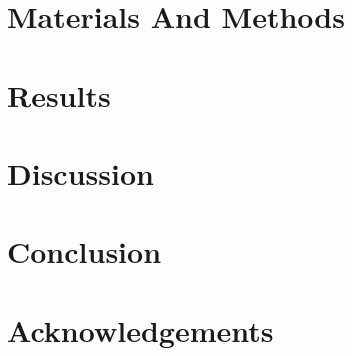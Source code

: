 \documentclass[english, a4paper, 12pt, twoside]{article}
\numberwithin{equation}{section} %
\begin{document}
\section{Materials And Methods}
    
\clearpage

\section{Results}
    
\clearpage


\section{Discussion}
    
\clearpage

\section{Conclusion}
    
\clearpage

\section{Acknowledgements}
    
\clearpage

%     

\newpage
\renewcommand\refname{References} %
{ %
}

\newpage
\renewcommand{\appendixpagename}{Appendix} %
\renewcommand{\appendixtocname}{Appendix} %
\appendixpage 
\addappheadtotoc

\begin{appendices}
    
\end{appendices}
\end{document}
